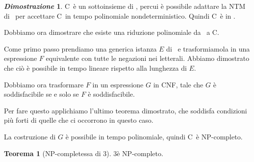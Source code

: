 \documentclass[12pt]{article}
\theoremstyle{definition}
\newtheorem*{mytheo}{Teorema}
\newtheorem*{myproof}{\em Dimostrazione}
\begin{document}
\begin{myproof}
  C\SAT\ \`e un sottoinsieme di \SAT, percui \`e possibile adattare la NTM di \SAT\ 
  per accettare C\SAT\ in tempo polinomiale nondeterministico. Quindi C\SAT\ \`e in \NP.

  Dobbiamo ora dimostrare che esiste una riduzione polinomiale da \SAT\ a C\SAT.

  Come primo passo prendiamo una generica istanza \(E\) di \SAT\ e trasformiamola in una
  espressione \(F\) equivalente con tutte le negazioni nei letterali. Abbiamo dimostrato che ci\`o
  \`e possibile in tempo lineare rispetto alla lunghezza di \(E\).

  Dobbiamo ora trasformare \(F\) in un espressione \(G\) in CNF, tale che \(G\) \`e soddisfacibile
  se e solo se \(F\) \`e soddisfacibile.

  Per fare questo applichiamo l'ultimo teorema dimostrato, che soddisfa condizioni pi\`u forti di quelle
  che ci occorrono in questo caso.

  La costruzione di \(G\) \`e possibile in tempo polinomiale, quindi C\SAT\ \`e NP-completo.

  \hfill \qedsymbol
\end{myproof}

\begin{mytheo}[NP-completessa di 3\SAT]
  3\SAT \`e NP-completo.
\end{mytheo}
\end{document}
